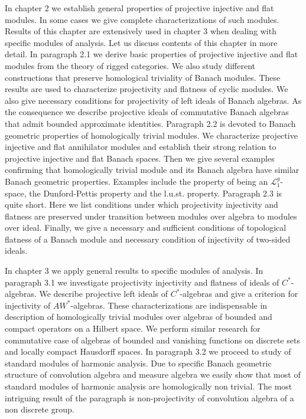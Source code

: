 \documentclass[11pt, a4paper, oneside]{thbook}
\begin{document}
In chapter 2 we establish general properties of projective injective and flat
modules. In some cases we give complete characterizations of such modules.
Results of this chapter are extensively used in chapter 3 when dealing with
specific modules of analysis. Let us discuss contents of this chapter in more
detail. In paragraph 2.1 we derive basic properties of projective injective and
flat modules from the theory of rigged categories. We also study different
constructions that preserve homological triviality of Banach modules. These
results are used to characterize projectivity and flatness of cyclic modules. We
also give necessary conditions for projectivity of left ideals of Banach
algebras. As the consequence we describe projective ideals of commutative Banach
algebras that admit bounded approximate identities. Paragraph 2.2 is devoted to
Banach geometric properties of homologically trivial modules. We characterize
projective injective and flat annihilator modules and establish their strong
relation to projective injective and flat Banach spaces. Then we give several
examples confirming that homologically trivial module and its Banach algebra
have similar Banach geometric properties. Examples include the property of being
an $\mathscr{L}_1^g$-space, the Dunford-Pettis property and the l.u.st.
property. Paragraph 2.3 is quite short. Here we list conditions under which
projectivity injectivity and flatness are preserved under transition between
modules over algebra to modules over ideal. Finally, we give a necessary and
sufficient conditions of topological flatness of a Banach module and necessary
condition of injectivity of two-sided ideals.

In chapter 3 we apply general results to specific modules of analysis. In
paragraph 3.1 we investigate projectivity injectivity and flatness of ideals of
$C^*$-algebras. We describe projective left ideals of $C^*$-algebras and give a
criterion for injectivity of $AW^*$-algebras. These characterizations are
indispensable in description of homologically trivial modules over algebras of
bounded and compact operators on a Hilbert space. We perform similar research
for commutative case of algebras of bounded and vanishing functions on discrete
sets and locally compact Hausdorff spaces. In paragraph 3.2 we proceed to study
of standard modules of harmonic analysis. Due to specific Banach geometric
structure of convolution algebra and measure algebra we easily show that most of
standard modules of harmonic analysis are homologically non trivial. The most
intriguing result of the paragraph is non-projectivity of convolution algebra of
a non discrete group. 
\end{document}
